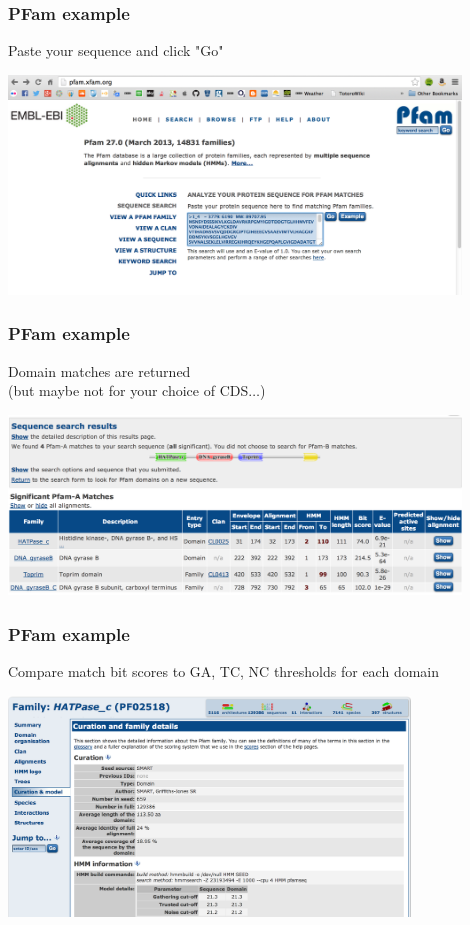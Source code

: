 \documentclass[table]{beamer}
\begin{document}
    \begin{frame}
      \frametitle{PFam example}  
      Paste your sequence and click "Go"
      \begin{center}
        \includegraphics[width=0.9\textwidth]{images/pfam8} 
      \end{center}      
    \end{frame}

    \begin{frame}
      \frametitle{PFam example}  
      Domain matches are returned \\
      (but maybe not for your choice of CDS$\ldots$)
      \begin{center}
        \includegraphics[width=0.9\textwidth]{images/pfam9} 
      \end{center}      
    \end{frame}

    \begin{frame}
      \frametitle{PFam example}  
      Compare match bit scores to GA, TC, NC thresholds for each domain
      \begin{center}
        \includegraphics[width=0.8\textwidth]{images/pfam10} 
      \end{center}      
    \end{frame}
\end{document}
